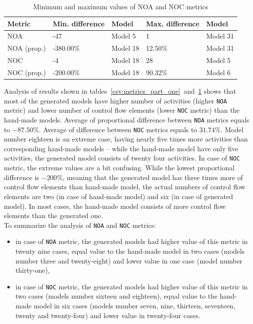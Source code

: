 \begin{table}[H]
	{\small
	\centering
	\begin{tabular}{|p{}|p{}|p{}|p{}|p{}|}
		\hline
		Metric & Min. difference & Model & Max. difference & Model \\
		\hline
		NOA & -47 & Model 5 & 1 & Model 31 \\
		\hline
		NOA (prop.) & -380.00\% & Model 18 & 12.50\% & Model 31 \\
		\hline
		NOC & -4 & Model 18 & 28 & Model 5 \\
		\hline
		NOC (prop.) & -200.00\% & Model 18 & 90.32\% & Model 6 \\
		\hline
	\end{tabular}
	}
	\caption{Minimum and maximum values of NOA and NOC metrics}
	\label{csv:noa_noc_max_min}
\end{table}
Analysis of results shown in tables~\ref{csv:metrics_part_one}~and~\ref{csv:noa_noc_max_min} shows that most of the generated models have higher number of activities (higher \texttt{NOA} metric) and lower number of control flow elements (lower \texttt{NOC} metric) than the hand-made models. Average of proportional difference between \texttt{NOA} metrics equals to $ -87.50\% $. Average of difference between \texttt{NOC} metrics equals to $ 31.74\% $. Model number eighteen is an extreme case, having nearly five times more activities than corresponding hand-made models -- while the hand-made model have only five activities, the generated model consists of twenty four activities. In case of \texttt{NOC} metric, the extreme values are a bit confusing. While the lowest proportional difference is $ -200\% $, meaning that the generated model has three times more of control flow elements than hand-made model, the actual numbers of control flow elements are two (in case of hand-made model) and six (in case of generated model). In most cases, the hand-made model consists of more control flow elements than the generated one.\\
To summarize the analysis of \texttt{NOA} and \texttt{NOC} metrics:
\begin{itemize}
	\item in case of \texttt{NOA} metric, the generated models had higher value of this metric in twenty nine cases, equal value to the hand-made model in two cases (models number three and twenty-eight) and lower value in one case (model number thirty-one),
	\item in case of \texttt{NOC} metric, the generated models had higher value of this metric in two cases (models number sixteen and eighteen), equal value to the hand-made model in six cases (models number seven, nine, thirteen, seventeen, twenty and twenty-four) and lower value in twenty-four cases.
\end{itemize}
